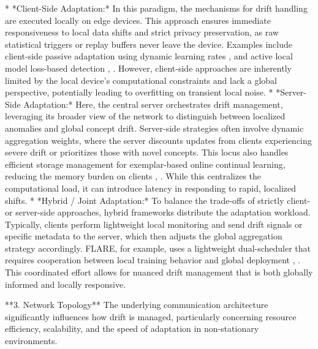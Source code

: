 \documentclass[journal]{IEEEtran}
\begin{document}
*   *Client-Side Adaptation:* In this paradigm, the mechanisms for drift handling are executed locally on edge devices. This approach ensures immediate responsiveness to local data shifts and strict privacy preservation, as raw statistical triggers or replay buffers never leave the device. Examples include client-side passive adaptation using dynamic learning rates \cite{Saile2024a}, \cite{Saile2024} and active local model loss-based detection \cite{Rahman2025}, \cite{Rahman2025a}. However, client-side approaches are inherently limited by the local device's computational constraints and lack a global perspective, potentially leading to overfitting on transient local noise.
*   *Server-Side Adaptation:* Here, the central server orchestrates drift management, leveraging its broader view of the network to distinguish between localized anomalies and global concept drift. Server-side strategies often involve dynamic aggregation weights, where the server discounts updates from clients experiencing severe drift or prioritizes those with novel concepts. This locus also handles efficient storage management for exemplar-based online continual learning, reducing the memory burden on clients \cite{Zhou2024}, \cite{paper62}. While this centralizes the computational load, it can introduce latency in responding to rapid, localized shifts.
*   *Hybrid / Joint Adaptation:* To balance the trade-offs of strictly client- or server-side approaches, hybrid frameworks distribute the adaptation workload. Typically, clients perform lightweight local monitoring and send drift signals or specific metadata to the server, which then adjusts the global aggregation strategy accordingly. FLARE, for example, uses a lightweight dual-scheduler that requires cooperation between local training behavior and global deployment \cite{Chow2023}, \cite{Hinder2024}. This coordinated effort allows for nuanced drift management that is both globally informed and locally responsive.

**3. Network Topology**
The underlying communication architecture significantly influences how drift is managed, particularly concerning resource efficiency, scalability, and the speed of adaptation in non-stationary environments.
\end{document}
